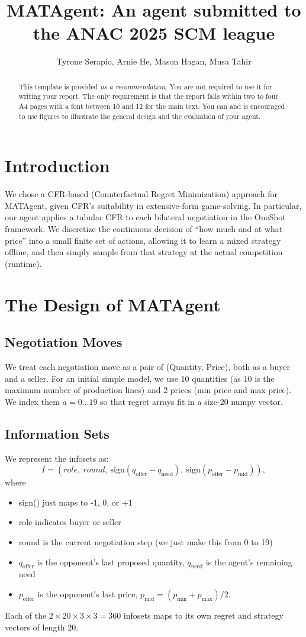 \documentclass{article}
\title{MATAgent: An agent submitted to the ANAC 2025 SCM league}
\author{Tyrone Serapio, Arnie He, Mason Hagan, Musa Tahir}
\begin{document}
\maketitle
\begin{abstract}
	This template is provided \emph{as a recommendation}. You are not required
	to use it for writing your report. The only requirement is that the report
	falls within two to four A4 pages with a font between 10 and 12 for the main
	text. You can and is encouraged to use figures to illustrate the general
	design and the evaluation of your agent.
\end{abstract}
\section{Introduction}
We chose a CFR-based (Counterfactual Regret Minimization) approach for MATAgent, given CFR's suitability in extensive-form game-solving. In particular, our agent applies a tabular CFR to each bilateral negotiation in the OneShot framework. We discretize the continuous decision of ``how much and at what price” into a small finite set of actions, allowing it to learn a mixed strategy offline, and then simply sample from that strategy at the actual competition (runtime).
\section{The Design of MATAgent}
\subsection{Negotiation Moves}
\par We treat each negotiation move as a pair of (Quantity, Price), both as a buyer and a seller. For an initial simple model, we use 10 quantities (as 10 is the maximum number of production lines) and 2 prices (min price and max price). We index them $a=0\ldots 19$ so that regret arrays fit in a size-20 numpy vector.
\subsection{Information Sets}
\par We represent the infosets as:
\[
I = (role,\ round,\ \mathrm{sign}(q_{\mathrm{offer}}-q_{\mathrm{need}}),\ \mathrm{sign}(p_{\mathrm{offer}}-p_{\mathrm{mid}})),
\]
where
\begin{itemize}
    \item sign() just maps to -1, 0, or +1
    \item role indicates buyer or seller
    \item round is the current negotiation step (we just make this from 0 to 19)
    \item $q_{\mathrm{offer}}$ is the opponent’s last proposed quantity, $q_{\mathrm{need}}$ is the agent’s remaining need
    \item $p_{\mathrm{offer}}$ is the opponent’s last price, $p_{\mathrm{mid}}=(p_{\min}+p_{\max})/2$.
\end{itemize}
Each of the $2\times 20\times 3\times 3=360$ infosets maps to its own regret and strategy vectors of length 20.
\end{document}

